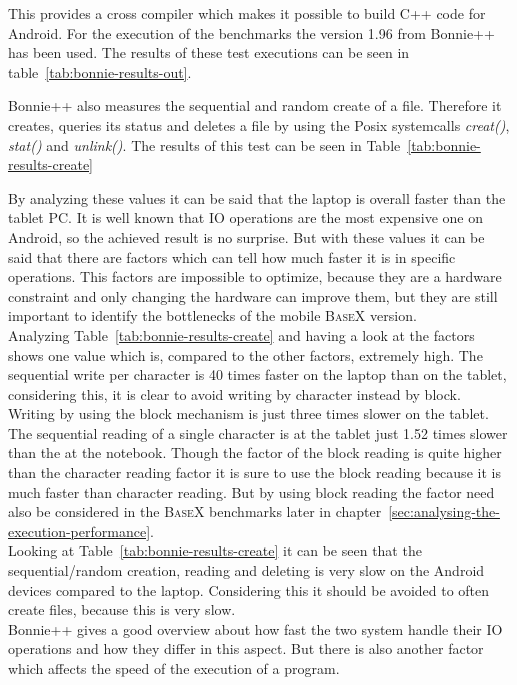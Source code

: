 This provides a cross compiler which makes it possible to build C++ code for Android.
For the execution of the benchmarks the version 1.96 from Bonnie++ has been used.
The results of these test executions can be seen in table~\ref{tab:bonnie-results-out}.

Bonnie++ also measures the sequential and random create of a file.
Therefore it creates, queries its status and deletes a file by using the Posix systemcalls \textit{creat()}, \textit{stat()} and \textit{unlink()}.
The results of this test can be seen in Table~\ref{tab:bonnie-results-create}

By analyzing these values it can be said that the laptop is overall faster than the tablet PC.
It is well known that IO operations are the most expensive one on Android, so the achieved result is no surprise. 
But with these values it can be said that there are factors which can tell how much faster it is in specific operations.
This factors are impossible to optimize, because they are a hardware constraint and only changing the hardware can improve them, but they are still important to identify the bottlenecks of the mobile \textsc{BaseX} version.\\
Analyzing Table~\ref{tab:bonnie-results-create} and having a look at the factors shows one value which is, compared to the other factors, extremely high.
The sequential write per character is 40 times faster on the laptop than on the tablet, considering this, it is clear to avoid writing by character instead by block.
Writing by using the block mechanism is just three times slower on the tablet.
The sequential reading of a single character is at the tablet just 1.52 times slower than the at the notebook.
Though the factor of the block reading is quite higher than the character reading factor it is sure to use the block reading because it is much faster than character reading.
But by using block reading the factor need also be considered in the \textsc{BaseX} benchmarks later in chapter~\ref{sec:analysing-the-execution-performance}.
\\
Looking at Table~\ref{tab:bonnie-results-create} it can be seen that the sequential/random creation, reading and deleting is very slow on the Android devices compared to the laptop.
Considering this it should be avoided to often create files, because this is very slow.\\
Bonnie++ gives a good overview about how fast the two system handle their IO operations and how they differ in this aspect.
But there is also another factor which affects the speed of the execution of a program.
